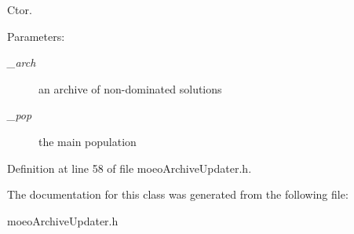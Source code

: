 Ctor. 

\begin{Desc}
\item[Parameters:]
\begin{description}
\item[{\em \_\-arch}]an archive of non-dominated solutions \item[{\em \_\-pop}]the main population \end{description}
\end{Desc}


Definition at line 58 of file moeo\-Archive\-Updater.h.

The documentation for this class was generated from the following file:\begin{CompactItemize}
\item 
moeo\-Archive\-Updater.h\end{CompactItemize}
